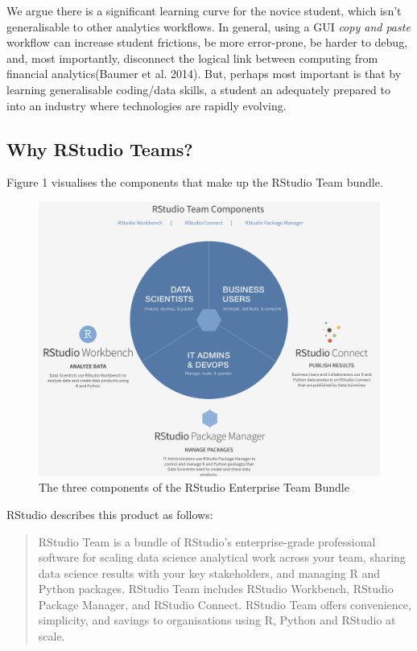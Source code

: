 \documentclass{article}
\begin{document}
We argue there is a significant learning curve for the novice student,
which isn't generalisable to other analytics workflows. In general,
using a GUI \emph{copy and paste} workflow can increase student
frictions, be more error-prone, be harder to debug, and, most
importantly, disconnect the logical link between computing from
financial analytics(Baumer et al. 2014). But, perhaps most important is
that by learning generalisable coding/data skills, a student an
adequately prepared to into an industry where technologies are rapidly
evolving.

\hypertarget{why-rstudio-teams}{%
\subsection{Why RStudio Teams?}\label{why-rstudio-teams}}

Figure 1 visualises the components that make up the RStudio Team bundle.

\begin{figure}

{\centering \includegraphics[width=0.7\linewidth]{img/Team} 

}

\caption{The three components of the RStudio Enterprise Team Bundle}\label{fig:rstudioteams}
\end{figure}

RStudio describes this product as follows:

\begin{quote}
RStudio Team is a bundle of RStudio's enterprise-grade professional
software for scaling data science analytical work across your team,
sharing data science results with your key stakeholders, and managing R
and Python packages. RStudio Team includes RStudio Workbench, RStudio
Package Manager, and RStudio Connect. RStudio Team offers convenience,
simplicity, and savings to organisations using R, Python and RStudio at
scale.
\end{quote}
\end{document}
